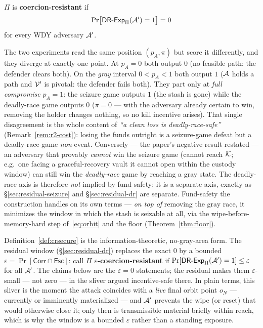 \begin{definition}\label{def:crsecure}
$\Pi$ is \textbf{coercion-resistant} if
\[
  \Pr\!\big[\mathsf{DR}\text{-}\mathsf{Exp}_{\Pi}(\mathcal{A}') = 1\big] = 0
\]
for every WDY adversary
$\mathcal{A}'$.
\end{definition}

\begin{remark}
The two experiments read the same position $(p_A,\pi)$ but score it differently, and
they diverge at exactly one point. At $p_A = 0$ both output $0$ (no feasible path:
the defender clears both). On the \emph{gray} interval $0 < p_A < 1$ both output $1$
($\mathcal{A}$ holds a path and $\mathcal{V}'$ is pivotal: the defender fails both). They
part only at \emph{full compromise} $p_A = 1$: the seizure game outputs $1$ (the stash is
gone) while the deadly-race game outputs $0$ ($\pi = 0$ --- with the adversary
already certain to win, removing the holder changes nothing, so no kill incentive
arises). That single disagreement is the whole content of \emph{``a clean loss is
deadly-race-safe''} (Remark~\ref{rem:r2-cost}): losing the funds outright is a
seizure-game defeat but a deadly-race-game \emph{non}-event. Conversely --- the
paper's negative result restated --- an adversary that provably \emph{cannot} win the
seizure game (cannot reach $\mathcal{K}$; e.g.\ one facing a graceful-recovery vault it cannot
open within the custody window) can still win the \emph{deadly-race} game by reaching
a gray state. The deadly-race axis is therefore \emph{not} implied by fund-safety; it
is a separate axis, exactly as \S\ref{sec:residual-seizure} and
\S\ref{sec:residual-dr} are separate. Fund-safety the construction handles on its own
terms --- \emph{on top of} removing the gray race, it minimizes the window in which
the stash is seizable at all, via the wipe-before-memory-hard step
of~\eqref{eq:orbit} and the floor (Theorem~\ref{thm:floor}).
\end{remark}

\begin{remark}
Definition~\ref{def:crsecure} is the information-theoretic, no-gray-area form. The
residual window (\S\ref{sec:residual-dr}) replaces the exact $0$ by a bounded
$\varepsilon = \Pr[\mathsf{Corr}\cap\mathsf{Esc}]$: call $\Pi$
\textbf{$\varepsilon$-coercion-resistant} if
$\Pr[\mathsf{DR}\text{-}\mathsf{Exp}_{\Pi}(\mathcal{A}') = 1] \le \varepsilon$ for all $\mathcal{A}'$. The claims
below are the $\varepsilon = 0$ statements; the residual makes them
$\varepsilon$-small --- not zero --- in the sliver argued incentive-safe there.
In plain terms, this sliver is the moment the attack coincides with a \emph{live}
final orbit point $o_N$ --- currently or imminently materialized --- and
$\mathcal{A}'$ prevents the wipe (or reset) that would otherwise close it; only then
is transmissible material briefly within reach, which is why the window is a
bounded $\varepsilon$ rather than a standing exposure.
\end{remark}

